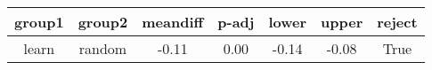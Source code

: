 \begin{tabular}{|c|c|c|c|c|c|c|}
\toprule
group1 &  group2 &  meandiff &  p-adj &  lower &  upper &  reject \\
\midrule
 learn &  random &     -0.11 &   0.00 &  -0.14 &  -0.08 &    True \\
\bottomrule
\end{tabular}
